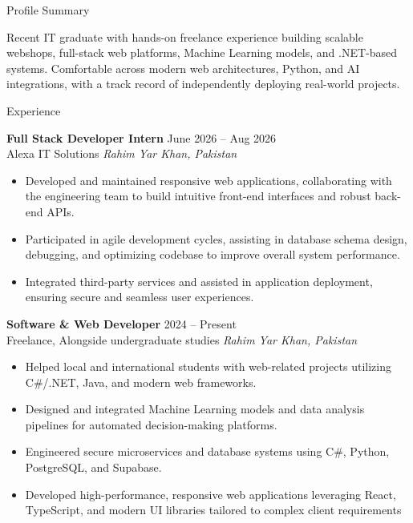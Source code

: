 \documentclass{resume} %
\begin{document}

\begin{rSection}{Profile Summary}

{Recent IT graduate with hands-on freelance experience building scalable webshops, full-stack web platforms, Machine Learning models, and .NET-based systems. Comfortable across modern web architectures, Python, and AI integrations, with a track record of independently deploying real-world projects.}

\end{rSection}




\begin{rSection}{Experience}

\textbf{Full Stack Developer Intern} \hfill June 2026 -- Aug 2026\\
Alexa IT Solutions \hfill \textit{Rahim Yar Khan, Pakistan}
 \begin{itemize}
    \itemsep -3pt {} 
     \item Developed and maintained responsive web applications, collaborating with the engineering team to build intuitive front-end interfaces and robust back-end APIs.
     \item Participated in agile development cycles, assisting in database schema design, debugging, and optimizing codebase to improve overall system performance.
     \item Integrated third-party services and assisted in application deployment, ensuring secure and seamless user experiences.
 \end{itemize}

\textbf{Software \& Web Developer} \hfill 2024 -- Present\\
Freelance, Alongside undergraduate studies \hfill \textit{Rahim Yar Khan, Pakistan}
 \begin{itemize}
    \itemsep -3pt {} 
     \item Helped local and international students with web-related projects utilizing C\#/.NET, Java, and modern web frameworks.
     \item Designed and integrated Machine Learning models and data analysis pipelines for automated decision-making platforms.
     \item Engineered secure microservices and database systems using C\#, Python, PostgreSQL, and Supabase.
     \item Developed high-performance, responsive web applications leveraging React, TypeScript, and modern UI libraries tailored to complex client requirements
 \end{itemize}

\end{rSection}
\end{document}
